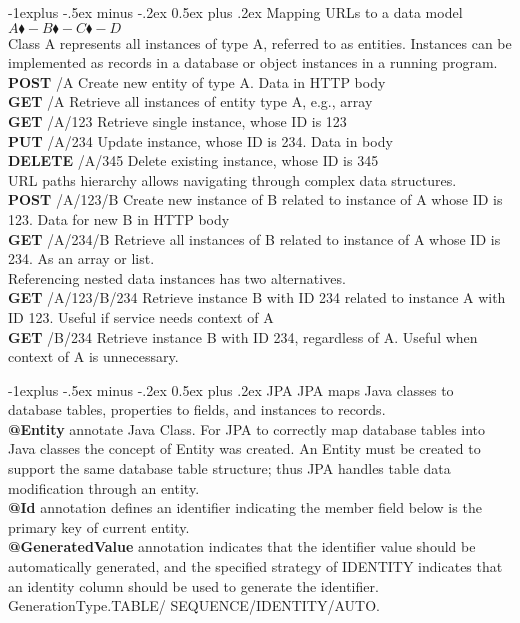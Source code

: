 \documentclass[10pt,landscape]{article}
\makeatletter
\renewcommand{\subsection}{\@startsection{subsection}{2}{0mm}%
                                {-1explus -.5ex minus -.2ex}%
                                {0.5ex plus .2ex}%
                                {\normalfont\normalsize\bfseries}}
\makeatother
\begin{document}
\begin{multicols}{3}
\subsection{Mapping URLs to a data model}
$A \blacklozenge- B \blacklozenge- C \blacklozenge- D $\\
Class A represents all instances of type A, referred to as entities. Instances can be implemented as records in a database or object instances in a running program. \\
\textbf{POST}		/A			Create new entity of type A. Data in HTTP body\\
\textbf{GET}		/A			Retrieve all instances of entity type A, e.g., array\\
\textbf{GET}		/A/123		Retrieve single instance, whose ID is 123\\
\textbf{PUT}		/A/234	Update instance, whose ID is 234. Data in body\\
\textbf{DELETE}		/A/345		Delete existing instance, whose ID is 345\\
URL paths hierarchy allows navigating through complex data structures.\\

\textbf{POST}	/A/123/B	Create new instance of B related to instance of A whose ID is 123. Data for new B in HTTP body\\
\textbf{GET}		/A/234/B	Retrieve all instances of B related to instance of A whose ID is 234. As an array or list.\\

Referencing nested data instances has two alternatives.\\
\textbf{GET} /A/123/B/234 Retrieve instance B with ID 234 related to instance A with ID 123. Useful if service needs context of A\\
\textbf{GET} /B/234	Retrieve instance B with ID 234, regardless of A. Useful when context of A is unnecessary.


\subsection{JPA}
JPA maps Java classes to database tables, properties to fields, and instances to records.\\

\textbf{@Entity} annotate Java Class. For JPA to correctly map database tables into Java classes the concept of Entity was created. An Entity must be created to support the same database table structure; thus JPA handles table data modification through an entity.\\
\textbf{@Id} annotation defines an identifier indicating the member field below is the primary key of current entity.\\
\textbf{@GeneratedValue} annotation indicates that the identifier value should be automatically generated, and the specified strategy of IDENTITY indicates that an identity column should be used to generate the identifier. GenerationType.TABLE/ SEQUENCE/IDENTITY/AUTO.\\


\end{multicols}
\end{document}
